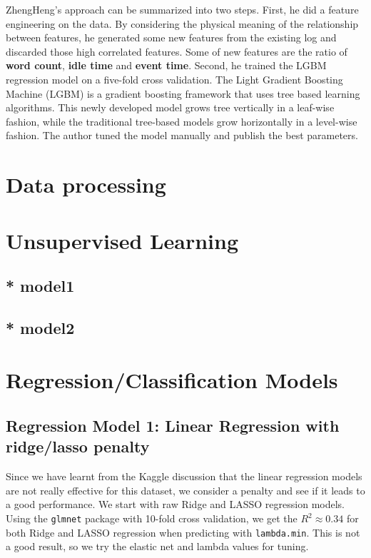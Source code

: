 \documentclass{article}
\begin{document}
ZhengHeng's approach can be summarized into two steps. First, he did a feature engineering on the data. 
By considering the physical meaning of the relationship between features, he generated some new features from 
the existing log and discarded those high correlated features. Some of new features are the ratio of 
\textbf{word count}, \textbf{idle time} and \textbf{event time}. Second, he trained the LGBM regression model
on a five-fold cross validation. The Light Gradient Boosting Machine (LGBM) is a gradient boosting framework
that uses tree based learning algorithms. 
This newly developed model grows tree vertically in a leaf-wise fashion, while the traditional tree-based models
grow horizontally in a level-wise fashion. The author tuned the model manually and publish the best parameters. 


\section{Data processing}


\section{Unsupervised Learning}

\subsection{* model1}


\subsection{* model2}


\section{Regression/Classification Models}

\subsection{Regression Model 1: Linear Regression with ridge/lasso penalty}
Since we have learnt from the Kaggle discussion that the linear regression models are not really effective for this dataset, 
we consider a penalty and see if it leads to a good performance. 
We start with raw Ridge and LASSO regression models. Using the \texttt{glmnet} package with 10-fold cross validation, 
we get the $R^2 \approx 0.34$ for both Ridge and LASSO regression when predicting with \texttt{lambda.min}. 
This is not a good result, so we try the elastic net and lambda values for tuning. 
\end{document}
